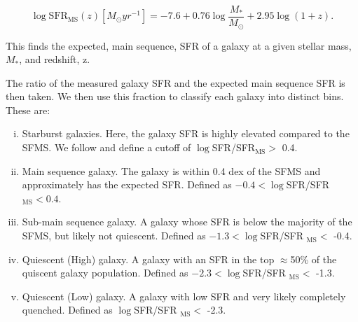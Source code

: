 \begin{equation}
    \log \text{SFR}_{\text{MS}}(z)[M_\odot yr^{-1}] = -7.6 + 0.76\log\frac{M_*}{M_\odot} + 2.95\log(1+z).
\end{equation}

\noindent This finds the expected, main sequence, SFR of a galaxy at a given stellar mass, $M_*$, and redshift, z.

The ratio of the measured galaxy SFR and the expected main sequence SFR is then taken. We then use this fraction to classify each galaxy into distinct bins. These are:

\begin{enumerate}[(i)]
    \item Starburst galaxies. Here, the galaxy SFR is highly elevated compared to the SFMS. We follow \citet{2019MNRAS.484.4360A} and define a cutoff of $\log$SFR/SFR$_{\text{MS}} >$ 0.4.
    \item Main sequence galaxy. The galaxy is within 0.4 dex of the SFMS and approximately has the expected SFR. Defined as $-0.4 < \log$SFR/SFR$_{\text{MS}} < 0.4$.
    \item Sub-main sequence galaxy. A galaxy whose SFR is below the majority of the SFMS, but likely not quiescent. Defined as $-1.3 < \log$SFR/SFR $_{\text{MS}} < $ -0.4.
    \item Quiescent (High) galaxy. A galaxy with an SFR in the top $\approx$50\% of the quiscent galaxy population. Defined as $-2.3 < \log$SFR/SFR $_{\text{MS}} <$ -1.3.
    \item Quiescent (Low) galaxy. A galaxy with low SFR and very likely completely quenched. Defined as $\log$SFR/SFR $_{\text{MS}} <$ -2.3.
\end{enumerate}

